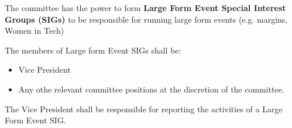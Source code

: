 \begin{clause}
    The committee has the power to form \textbf{Large Form Event Special Interest Groups (SIGs)} to be responsible for running large form events (e.g. margins, Women in Tech)
\end{clause}

\begin{subclause}
    The members of Large form Event SIGs shall be:
    \begin{itemize}
        \item Vice President
        \item Any othe relevant committee positions at the discretion of the committee.
    \end{itemize}
\end{subclause}

\begin{subclause}
    The Vice President shall be responsible for reporting the activities of a Large Form Event SIG.
\end{subclause}